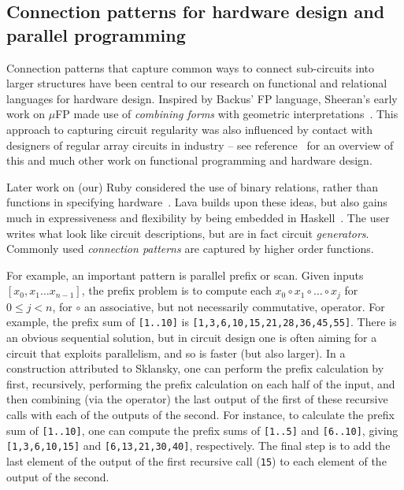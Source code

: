 \subsection{Connection patterns for hardware design and parallel programming}\label{sec:combinators}

Connection patterns that capture common ways to connect sub-circuits into larger structures have been central to our research on functional and relational languages for hardware design.
Inspired by Backus' FP language, Sheeran's early work on $\mu$FP made use of
{\em combining forms} with geometric interpretations~\cite{SheeranLFP84}. This approach
to capturing circuit regularity was also influenced by contact
with designers of regular array circuits in industry -- see reference~\cite{SheeranJUCS} for an overview of this and much other work on functional programming and hardware design.

Later work on (our) Ruby considered the use of binary relations, rather than functions in specifying hardware~\cite{LyngbyRuby}. Lava builds upon these ideas, but also gains much in expressiveness and flexibility by being embedded in Haskell~\cite{lavaICFP,ClaessenThesis}.
The user writes what look like circuit descriptions, but are in fact circuit {\em generators}. Commonly used {\em connection patterns} are captured by higher order functions.

For example, an important pattern is parallel prefix or scan. Given inputs\newline $[x_0, x_1 \ldots x_{n-1}]$, the prefix problem is to compute each $x_0 \circ x_1 \circ \ldots \circ x_j$ for $0 \leq j < n$, for $\circ$ an associative, but not necessarily commutative, operator. For example, the prefix sum of {\tt [1..10]} is {\tt [1,3,6,10,15,21,28,36,45,55]}. There is an obvious sequential solution, but in circuit design one is often aiming for a circuit that exploits parallelism, and so is faster (but also larger). In a construction attributed to Sklansky, one can perform the prefix
calculation by first, recursively, performing the prefix calculation on 
each half of the input, and then combining (via the operator) the last output of the first of these
recursive calls with each of the outputs of the second.
For instance, to calculate the prefix sum of {\tt [1..10]}, one can compute the prefix
sums of {\tt [1..5]} and {\tt [6..10]}, giving {\tt [1,3,6,10,15]}
and {\tt [6,13,21,30,40]}, respectively. 
The final step is to add the last element of the output of the first recursive call ({\tt 15}) to each element of
the output of the second.

